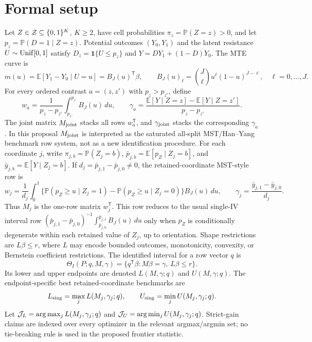 \documentclass[11pt]{article}
\newcommand{\E}{\mathbb{E}}
\renewcommand{\Pr}{\mathbb{P}}
\newcommand{\one}{\mathbf{1}}
\newcommand{\transpose}{\mathsf{T}}
\theoremstyle{definition}
\theoremstyle{plain}
\theoremstyle{remark}
\begin{document}
\section{Formal setup}
Let \(Z\in{\cal Z}\subseteq\{0,1\}^K\), \(K\ge2\), have cell probabilities
\(\pi_z=\Pr(Z=z)>0\), and let \(p_z=\Pr(D=1\mid Z=z)\).  Potential outcomes
\((Y_0,Y_1)\) and the latent resistance \(U\sim{\rm Unif}[0,1]\) satisfy
\(D_z=\one\{U\le p_z\}\) and \(Y=DY_1+(1-D)Y_0\).  The MTE curve is
\[
m(u)=\E[Y_1-Y_0\mid U=u]=B_J(u)^\transpose\beta,\qquad
B_J(u)_\ell={J\choose \ell}u^\ell(1-u)^{J-\ell},\quad \ell=0,\ldots,J .
\]
For every ordered contrast \(a=(z,z')\) with \(p_z>p_{z'}\), define
\[
w_a=\frac{1}{p_z-p_{z'}}\int_{p_{z'}}^{p_z}B_J(u)\,du,\qquad
\gamma_a=\frac{\E[Y\mid Z=z]-\E[Y\mid Z=z']}{p_z-p_{z'}}.
\]
The joint matrix \(M_{\rm joint}\) stacks all rows \(w_a^\transpose\), and
\(\gamma_{\rm joint}\) stacks the corresponding \(\gamma_a\).  In this
proposal \(M_{\rm joint}\) is interpreted as the saturated all-split
MST/Han--Yang benchmark row system, not as a new identification procedure.
For each coordinate \(j\), write \(\pi_{j,b}=\Pr(Z_j=b)\),
\(\bar p_{j,b}=\E[p_Z\mid Z_j=b]\), and
\(\bar y_{j,b}=\E[Y\mid Z_j=b]\).  If
\(d_j=\bar p_{j,1}-\bar p_{j,0}\ne0\), the retained-coordinate MST-style row is
\[
w_j=\frac{1}{d_j}\int_0^1
\{\Pr(p_Z\ge u\mid Z_j=1)-\Pr(p_Z\ge u\mid Z_j=0)\}B_J(u)\,du,\qquad
\gamma_j=\frac{\bar y_{j,1}-\bar y_{j,0}}{d_j}.
\]
Thus \(M_j\) is the one-row matrix \(w_j^\transpose\).  This row reduces to
the usual single-IV interval row
\((\bar p_{j,1}-\bar p_{j,0})^{-1}\int_{\bar p_{j,0}}^{\bar p_{j,1}}B_J(u)\,du\)
only when \(p_Z\) is conditionally degenerate within each retained value of
\(Z_j\), up to orientation.  Shape restrictions are \(L\beta\le r\), where
\(L\) may encode bounded outcomes, monotonicity, convexity, or Bernstein
coefficient restrictions.  The identified interval for a row vector \(q\) is
\[
\Theta_I(P;q,M,\gamma)=
\{q^\transpose\beta: M\beta=\gamma,\ L\beta\le r\}.
\]
Its lower and upper endpoints are denoted \(L(M,\gamma;q)\) and
\(U(M,\gamma;q)\).  The endpoint-specific best retained-coordinate benchmarks are
\[
L_{\rm sing}=\max_j L(M_j,\gamma_j;q),\qquad
U_{\rm sing}=\min_j U(M_j,\gamma_j;q).
\]
Let \({\cal J}_L=\arg\max_j L(M_j,\gamma_j;q)\) and
\({\cal J}_U=\arg\min_j U(M_j,\gamma_j;q)\).  Strict-gain claims are indexed
over every optimizer in the relevant argmax/argmin set; no tie-breaking rule
is used in the proposed frontier statistic.
\end{document}
